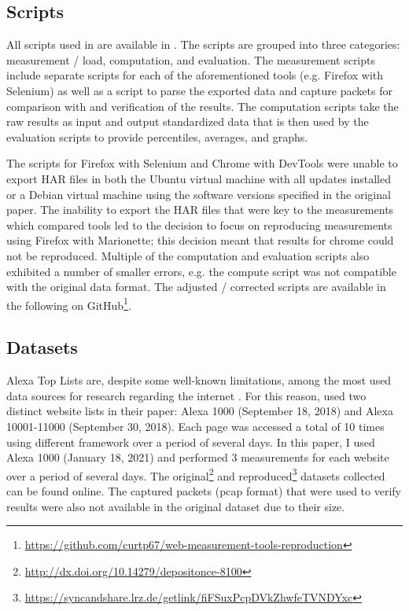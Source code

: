 \subsection{Scripts}
\label{sec:scripts}
All scripts used in \cite{10.1007/978-3-030-15986-3_19} are available in \cite{enghardt_2019}. The scripts are grouped into three categories: measurement / load, computation, and evaluation. The measurement scripts include separate scripts for each of the aforementioned tools (e.g. Firefox with Selenium) as well as a script to parse the exported data and capture packets for comparison with and verification of the results. The computation scripts take the raw results as input and output standardized data that is then used by the evaluation scripts to provide percentiles, averages, and graphs.

The scripts for Firefox with Selenium and Chrome with DevTools were unable to export HAR files in both the Ubuntu virtual machine with all updates installed or a Debian virtual machine using the software versions specified in the original paper. The inability to export the HAR files that were key to the measurements which compared tools led to the decision to focus on reproducing measurements using Firefox with Marionette; this decision meant that results for chrome could not be reproduced. Multiple of the computation and evaluation scripts also exhibited a number of smaller errors, e.g. the compute script was not compatible with the original data format. The adjusted / corrected scripts are available in the following on GitHub\footnote{\url{https://github.com/curtp67/web-measurement-tools-reproduction}}.

\subsection{Datasets}
Alexa Top Lists are, despite some well-known limitations, among the most used data sources for research regarding the internet \cite{10.1145/3278532.3278574}. For this reason, \citeauthor{10.1007/978-3-030-15986-3_19}  used two distinct website lists in their paper: Alexa 1000 (September 18, 2018) and Alexa 10001-11000 (September 30, 2018). Each page was accessed a total of 10 times using different framework over a period of several days. In this paper, I used Alexa 1000 (January 18, 2021) and performed 3 measurements for each website over a period of several days. The original\footnote{\url{http://dx.doi.org/10.14279/depositonce-8100}} and reproduced\footnote{\url{https://syncandshare.lrz.de/getlink/fiFSuxPcpDVkZhwfeTVNDYxc}} datasets collected can be found online. The captured packets (pcap format) that were used to verify results were also not available in the original dataset due to their size.

